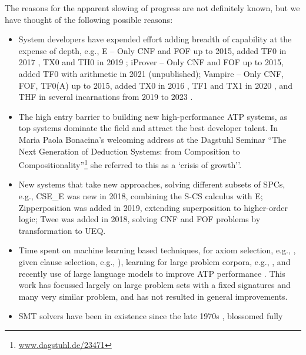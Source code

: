 \documentclass[runningheads]{llncs}
\begin{document}
The reasons for the apparent slowing of progress are not definitely known, but we have thought of 
the following possible reasons:
\begin{itemize}
\item System developers have expended effort adding breadth of capability at the expense of 
      depth, e.g., 
      E -- Only CNF and FOF up to 2015, added TF0 in 2017 \cite{SCV19}, TX0 and TH0 in 2019 
           \cite{VB+19};
      iProver -- Only CNF and FOF up to 2015, added TF0 with arithmetic in 2021 (unpublished);
      Vampire -- Only CNF, FOF, TF0(A) up to 2015, added TX0 in 2016 \cite{KK+16}, 
           TF1 and TX1 in 2020 \cite{BR20-IJCAR}, and THF in several incarnations from 2019 to 
           2023 \cite{BR19,Bha20-Thesis,BRS23}.
\item The high entry barrier to building new high-performance ATP systems, as top systems
      dominate the field and attract the best developer talent.
      In Maria Paola Bonacina's welcoming address at the Dagstuhl Seminar ``The Next Generation 
      of Deduction Systems: from Composition to Compositionality''\footnote{%
      \href{https://www.dagstuhl.de/23471}{www.dagstuhl.de/23471}} she referred to this as a
     `crisis of growth''.
\item New systems that take new approaches, solving different subsets of SPCs, e.g.,
      CSE\_E \cite{XL+18} was new in 2018, combining the S-CS calculus with E;
      Zipperposition \cite{BB+21} was added in 2019, extending superposition to higher-order logic;
      Twee \cite{Sma21} was added in 2018, solving CNF and FOF problems by transformation to UEQ.
\item Time spent on machine learning based techniques, for 
      axiom selection, e.g., \cite{Urb06,KB14}, 
      given clause selection, e.g., \cite{JU17-CICM,CA+21,AA+22-ML,MS23}), 
      learning for large problem corpora, e.g., \cite{KM+14,JU19,BL+19-ICML}, 
      and recently use of large language models to improve ATP performance \cite{WX+23,AS+23}.
      This work has focussed largely on large problem sets with a fixed signatures and many
      very similar problem, and has not resulted in general improvements.
\item SMT solvers have been in existence since the late 1970s \cite{NO79}, blossomed fully

\end{itemize}
\end{document}
